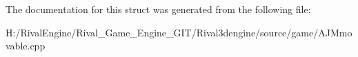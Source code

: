 The documentation for this struct was generated from the following file\+:\begin{DoxyCompactItemize}
\item 
H\+:/\+Rival\+Engine/\+Rival\+\_\+\+Game\+\_\+\+Engine\+\_\+\+G\+I\+T/\+Rival3dengine/source/game/A\+J\+Mmovable.\+cpp\end{DoxyCompactItemize}
